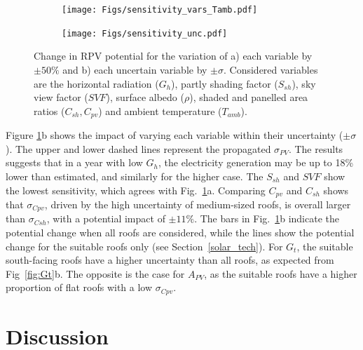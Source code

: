 \begin{figure}[tb]
\centering
\begin{subfigure}{.49\textwidth}
  \centering
  \texttt{[image: Figs/sensitivity\_vars\_Tamb.pdf]}
  \subcaption{}
\end{subfigure}
\begin{subfigure}{.49\textwidth}
  \centering
  \texttt{[image: Figs/sensitivity\_unc.pdf]}  
  \subcaption{}
\end{subfigure}
\caption{Change in RPV potential for the variation of a) each variable by $\pm 50\%$ and b) each uncertain variable by $\pm \sigma$. Considered variables are the horizontal radiation ($G_h$), partly shading factor ($S_{sh}$), sky view factor ($\mathit{SVF}$), surface albedo ($\rho$), shaded and panelled area ratios ($C_{sh}, C_{\mathit{pv}}$) and ambient temperature ($T_{amb}$).}
\label{fig:sens_vars}
\end{figure}

Figure \ref{fig:sens_vars}b shows the impact of varying each variable within their uncertainty ($\pm \sigma$). 
The upper and lower dashed lines represent the propagated $\sigma_{PV}$. 
The results suggests that in a year with low $G_h$, the electricity generation may be up to 18\% lower than estimated, and similarly for the higher case. 
The $S_{sh}$ and $\mathit{SVF}$ show the lowest sensitivity, which agrees with Fig.~\ref{fig:sens_vars}a.
Comparing $C_{\mathit{pv}}$ and $C_{sh}$ shows that $\sigma_{\mathit{Cpv}}$, driven by the high uncertainty of medium-sized roofs, is overall larger than $\sigma_{\mathit{Csh}}$, with a potential impact of $\pm 11 \%$. 
%
The bars in Fig.~\ref{fig:sens_vars}b indicate the potential change when all roofs are considered, while the lines show the potential change for the suitable roofs only (see Section~\ref{solar_tech}). 
For $G_t$, the suitable south-facing roofs have a higher uncertainty than all roofs, as expected from Fig~\ref{fig:Gt}b. 
The opposite is the case for $A_{PV}$, as the suitable roofs have a higher proportion of flat roofs with a low $\sigma_{\mathit{Cpv}}$.


\section{Discussion}
\label{discussion_pv}

